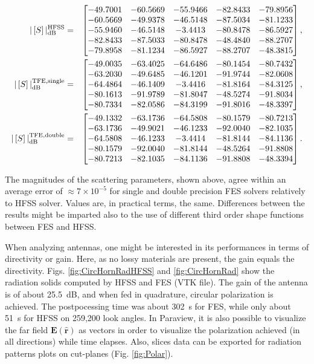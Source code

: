 \begin{eqnarray*}
|\left[S\right]|_\mathrm{dB}^\mathrm{HFSS} & = &
\begin{bmatrix}
  -49.7001 & -60.5669 & -55.9466 & -82.8433 & -79.8956 \\
  -60.5669 & -49.9378 & -46.5148 & -87.5034 & -81.1233 \\
  -55.9460 & -46.5148 &  -3.4413 & -80.8478 & -86.5927 \\
  -82.8433 & -87.5033 & -80.8478 & -48.4840 & -88.2707 \\
  -79.8958 & -81.1234 & -86.5927 & -88.2707 & -48.3815
\end{bmatrix},\\
|\left[S\right]|_\mathrm{dB}^\mathrm{TFE,single} & = &
\begin{bmatrix}
  -49.0035 & -63.4025 & -64.6486 & -80.1454 & -80.7432 \\
  -63.2030 & -49.6485 & -46.1201 & -91.9744 & -82.0608 \\
  -64.4864 & -46.1409 &  -3.4416 & -81.8164 & -84.3125 \\
  -80.1613 & -91.9789 & -81.8047 & -48.5274 & -91.8034 \\
  -80.7334 & -82.0586 & -84.3199 & -91.8016 & -48.3397
\end{bmatrix},\\
|\left[S\right]|_\mathrm{dB}^\mathrm{TFE,double} & = & 
\begin{bmatrix}
  -49.1332 & -63.1736 & -64.5808 & -80.1579 & -80.7213 \\
  -63.1736 & -49.9021 & -46.1233 & -92.0040 & -82.1035 \\
  -64.5808 & -46.1233 &  -3.4414 & -81.8144 & -84.1136 \\
  -80.1579 & -92.0040 & -81.8144 & -48.5264 & -91.8808 \\
  -80.7213 & -82.1035 & -84.1136 & -91.8808 & -48.3394 \\
\end{bmatrix}.
\end{eqnarray*}

The magnitudes of the scattering parameters, shown above, agree within an average error of $\approx 7 \times 10^{-5}$ for single and double precision FES solvers relatively to HFSS solver. Values are, in practical terms, the same. Differences between the results might be imparted also to the use of different third order shape functions between FES and HFSS.

When analyzing antennas, one might be interested in its performances in terms of directivity or gain. Here, as no lossy materials are present, the gain equals the directivity. Figs. \ref{fig:CircHornRadHFSS} and \ref{fig:CircHornRad} show the radiation solids computed by HFSS and FES (VTK file). The gain of the antenna is of about 25.5~dB, and when fed in quadrature, circular polarization is achieved. The postpocessing time was about 302~s for FES, while only about 51~s for HFSS on 259,200 look angles. In Paraview, it is also possible to visualize the far field $\mathbf{E}(\hat{\mathbf{r}})$ as vectors in order to visualize the polarization achieved (in all directions) while time elapses. Also, slices data can be exported for radiation patterns plots on cut-planes (Fig. \ref{fig:Polar}).

